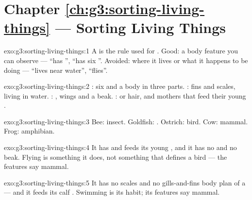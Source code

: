 \section*{Chapter \ref{ch:g3:sorting-living-things} --- Sorting Living Things}

\begin{solution}{exo:g3:sorting-living-things:1}
A  is the rule used for . Good: a body feature
you can observe --- ``has '', ``has six ''. Avoided:
where it lives or what it happens to be doing --- ``lives near
water'', ``flies''.
\end{solution}

\begin{solution}{exo:g3:sorting-living-things:2}
: six  and a body in three parts. : fins and
scales, living in water. : , wings and a beak.
:  or hair, and mothers that feed their young .
\end{solution}

\begin{solution}{exo:g3:sorting-living-things:3}
Bee: insect. Goldfish: . Ostrich: bird. Cow: mammal. Frog:
amphibian.
\end{solution}

\begin{solution}{exo:g3:sorting-living-things:4}
It has  and feeds its young , and it has no  and
no beak. Flying is something it does, not something that defines
a bird --- the features say mammal.
\end{solution}

\begin{solution}{exo:g3:sorting-living-things:5}
It has no scales and no gills-and-fins body plan of a  ---
and it feeds its calf . Swimming is its habit; its features
say mammal.
\end{solution}

